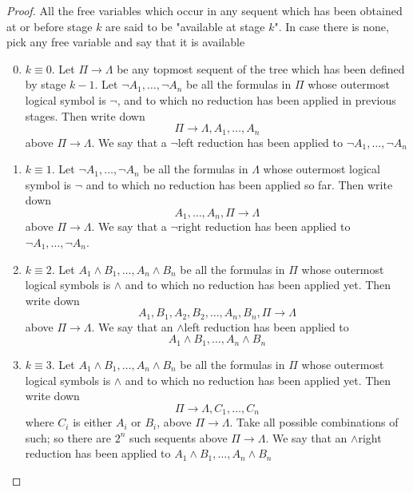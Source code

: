 \documentclass[11pt]{article}
\begin{document}
\begin{proof}
All the free variables which occur in any sequent which has been obtained at or before
stage \(k\) are said to be "available at stage \(k\)". In case there is none, pick any free
variable and say that it is available
\begin{enumerate}
\setcounter{enumi}{-1}
\item \(k\equiv 0\). Let \(\Pi\to\Lambda\) be any topmost sequent of the tree which has been defined
by stage \(k-1\). Let \(\neg A_1,\dots,\neg A_n\) be all the formulas in \(\Pi\) whose outermost logical
symbol is \(\neg\), and to which no reduction has been applied in previous stages. Then write
down
\begin{equation*}
\Pi\to\Lambda,A_1,\dots,A_n
\end{equation*}
above \(\Pi\to\Lambda\). We say that a \(\neg\)left reduction has been applied
to \(\neg A_1,\dots,\neg A_n\)
\item \(k\equiv1\). Let \(\neg A_1,\dots,\neg A_n\) be all the formulas in \(\Lambda\) whose outermost logical
symbol is \(\neg\) and to which no reduction has been applied so far. Then write down
\begin{equation*}
A_1,\dots,A_n,\Pi\to\Lambda
\end{equation*}
above \(\Pi\to\Lambda\). We say that a \(\neg\)right reduction has been applied
to \(\neg A_1,\dots,\neg A_n\).
\item \(k\equiv2\). Let \(A_1\wedge B_1,\dots,A_n\wedge B_n\) be all the formulas in \(\Pi\) whose
outermost logical symbols is \(\wedge\) and to which no reduction has been applied yet. Then
write down
\begin{equation*}
A_1,B_1,A_2,B_2,\dots,A_n,B_n,\Pi\to\Lambda
\end{equation*}
above \(\Pi\to\Lambda\). We say that an \(\wedge\)left reduction has been applied to
\begin{equation*}
A_1\wedge B_1,\dots,A_n\wedge B_n
\end{equation*}
\item \(k\equiv3\). Let \(A_1\wedge B_1,\dots,A_n\wedge B_n\) be all the formulas in \(\Pi\) whose
outermost logical symbols is \(\wedge\) and to which no reduction has been applied yet. Then
write down
\begin{equation*}
\Pi\to\Lambda, C_1,\dots,C_n
\end{equation*}
where \(C_i\) is either \(A_i\) or \(B_i\), above \(\Pi\to\Lambda\). Take all possible
combinations of such; so there are \(2^n\) such sequents above \(\Pi\to\Lambda\). We say that
an \(\wedge\)right reduction has been applied to \(A_1\wedge B_1,\dots,A_n\wedge B_n\)

\end{enumerate}
\end{proof}
\end{document}
